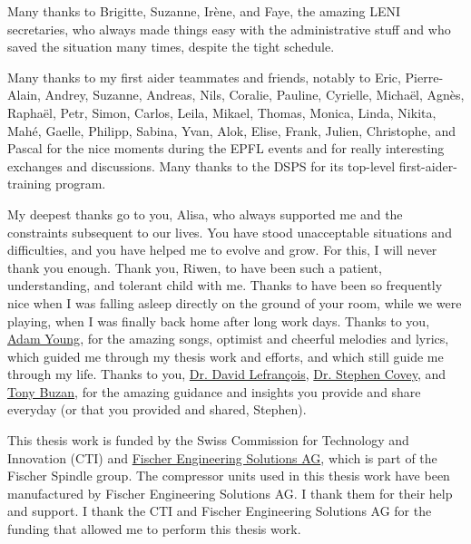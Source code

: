 Many thanks to Brigitte, Suzanne, Irène, and Faye, the amazing LENI
secretaries, who always made things easy with the administrative stuff
and who saved the situation many times, despite the tight schedule.

Many thanks to my first aider teammates and friends, notably to Eric,
Pierre-Alain, Andrey, Suzanne, Andreas, Nils, Coralie, Pauline,
Cyrielle, Michaël, Agnès, Raphaël, Petr, Simon, Carlos, Leila, Mikael,
Thomas, Monica, Linda, Nikita, Mahé, Gaelle, Philipp, Sabina, Yvan,
Alok, Elise, Frank, Julien, Christophe, and Pascal for the nice
moments during the EPFL events and for really interesting exchanges
and discussions. Many thanks to the DSPS for its top-level
first-aider-training program.

My deepest thanks go to you, Alisa, who always supported me and the
constraints subsequent to our lives. You have stood unacceptable
situations and difficulties, and you have helped me to evolve and
grow. For this, I will never thank you enough. Thank you, Riwen, to
have been such a patient, understanding, and tolerant child with
me. Thanks to have been so frequently nice when I was falling asleep
directly on the ground of your room, while we were playing, when I was
finally back home after long work days. Thanks to you,
\href{https://en.wikipedia.org/wiki/Adam_Young}{Adam Young}, for the
amazing songs, optimist and cheerful melodies and lyrics, which guided
me through my thesis work and efforts, and which still guide me
through my life. Thanks to you,
\href{https://www.youtube.com/playlist?list=PLIB0FUzmhLoSCRLM2WFt_mz6plvulw6hU}{Dr. David
  Lefrançois},
\href{https://en.wikipedia.org/wiki/Stephen_Covey}{Dr. Stephen Covey},
and \href{https://en.wikipedia.org/wiki/Tony_Buzan}{Tony Buzan}, for
the amazing guidance and insights you provide and share everyday (or
that you provided and shared, Stephen).

This thesis work is funded by the Swiss Commission for Technology and
Innovation (CTI) and
\href{http://www.fischerspindle.com/facilities/fischer-engineering-solutions-ag/}{Fischer
  Engineering Solutions AG}, which is part of the Fischer Spindle
group. The compressor units used in this thesis work have been
manufactured by Fischer Engineering Solutions AG. I thank them for
their help and support. I thank the CTI and Fischer Engineering
Solutions AG for the funding that allowed me to perform this thesis
work.
